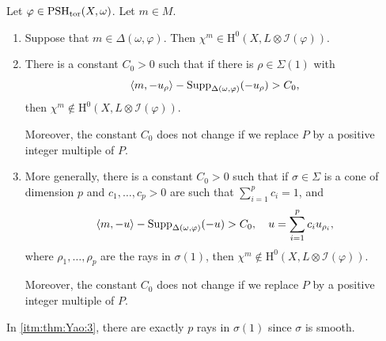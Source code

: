 \begin{theorem}[Yao]\label{thm:Yao}
    Let $\varphi\in \mathrm{PSH}_{\mathrm{tor}}(X,\omega)$. Let $m\in M$.
    \begin{enumerate}
        \item\label{itm:thm:Yao:1} Suppose that $m\in \Delta(\omega,\varphi)$. Then $\chi^m\in \mathrm{H}^0(X,L\otimes \mathcal{I}(\varphi))$.
        \item\label{itm:thm:Yao:2} There is a constant $C_0>0$ such that if there is $\rho\in \Sigma(1)$ with
         \begin{equation}\label{eq:mawayC0}
            \langle m,-u_{\rho}\rangle -\operatorname{Supp}_{\Delta(\omega,\varphi)}(-u_{\rho})> C_0,
        \end{equation}
        then $\chi^m\not\in \mathrm{H}^0(X,L\otimes \mathcal{I}(\varphi))$.

        Moreover, the constant $C_0$ does not change if we replace $P$ by a positive integer multiple of $P$.
        \item\label{itm:thm:Yao:3} More generally, there is a constant $C_0>0$ such that if $\sigma\in \Sigma$ is a cone of dimension $p$ and $c_1,\ldots,c_{p}>0$ are such that $\sum_{i=1}^p c_i=1$, and
        \begin{equation}\label{eq:mawayC1}
            \langle m,-u\rangle -\operatorname{Supp}_{\Delta(\omega,\varphi)}(-u)> C_0,\quad u=\sum_{i=1}^{p} c_i u_{\rho_i},
        \end{equation}
        where $\rho_1,\ldots,\rho_p$ are the rays in $\sigma(1)$, then $\chi^m\not\in \mathrm{H}^0(X,L\otimes \mathcal{I}(\varphi))$.

        Moreover, the constant $C_0$ does not change if we replace $P$ by a positive integer multiple of $P$.
    \end{enumerate}
\end{theorem}
In \ref{itm:thm:Yao:3}, there are exactly $p$ rays in $\sigma(1)$ since $\sigma$ is smooth.
